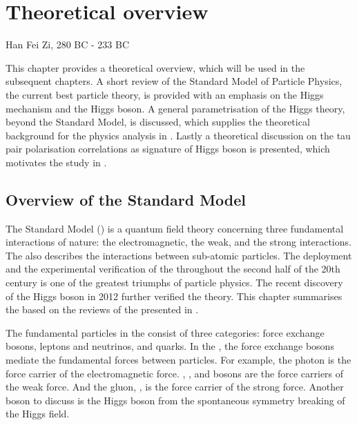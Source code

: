 \chapter{Theoretical overview}
\label{chap:Theory}

%
{Han Fei Zi, 280 BC - 233 BC}%

This chapter provides a theoretical overview, which will be used in the subsequent  chapters. A short review of the Standard Model of Particle Physics, the current best particle theory, is provided with an emphasis on the Higgs mechanism and the Higgs boson. A general parametrisation of the Higgs theory, beyond the Standard Model, is discussed, which supplies the theoretical background for the physics analysis in . Lastly a theoretical discussion on the tau pair polarisation correlations as signature of Higgs boson is presented, which motivates the study in .

\section{Overview of the Standard Model}

The Standard Model (\SM) is a quantum field theory concerning three fundamental interactions of nature: the electromagnetic, the weak, and the strong interactions. The \SM also describes the interactions between sub-atomic particles. The deployment and the experimental verification of the \SM throughout the second half of the 20th century is one of the greatest triumphs of particle physics. The recent discovery of the Higgs boson in 2012 \cite{Aad:2012tfa,Chatrchyan:2012ufa} further verified the theory. This chapter summarises the \SM based on the reviews of the \SM presented in \cite{Agashe:2014kda,Thomson:2013zua,Tong:QFT,Gripaios:GFT}.

The fundamental particles in the \SM consist of three categories: force exchange bosons, leptons and neutrinos, and quarks. In the \SM, the force exchange bosons mediate the fundamental forces between particles. For example, the photon is the force carrier of the electromagnetic force. \PWp, \PWm, and \PZ  bosons are the force carriers of the weak force. And the gluon, \Pg, is the force carrier of the strong force. Another boson to discuss is the Higgs boson from the spontaneous symmetry breaking of the Higgs field.


